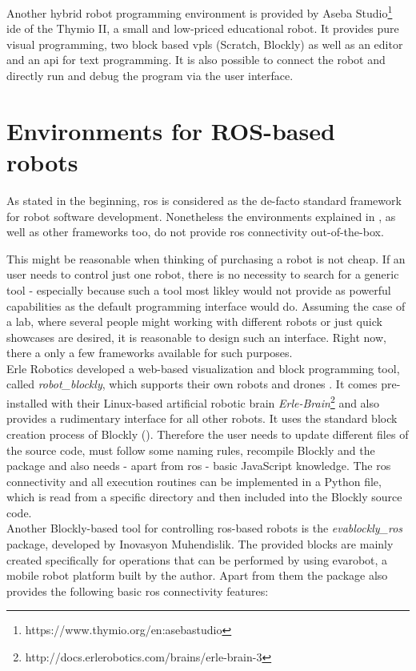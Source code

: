 Another hybrid robot programming environment is provided by Aseba Studio\footnote{https://www.thymio.org/en:asebastudio} \gls{ide} of the Thymio II, a small and low-priced educational robot. It provides pure visual programming, two block based \glspl{vpl} (Scratch, Blockly) as well as an editor and an \gls{api} for text programming. It is also possible to connect the robot and directly run and debug the program via the user interface.

\section{Environments for ROS-based robots} \label{sec:RosEnvs}
As stated in the beginning, \gls{ros} is considered as the de-facto standard framework for robot software development. Nonetheless the environments explained in , as well as other frameworks too, do not provide \gls{ros} connectivity out-of-the-box.

This might be reasonable when thinking of purchasing a robot is not cheap. If an user needs to control just one robot, there is no necessity to search for a generic tool - especially because such a tool most likley would not provide as powerful capabilities as the default programming interface would do. Assuming the case of a lab, where several people might working with different robots or just quick showcases are desired, it is reasonable to design such an interface. Right now, there a only a few frameworks available for such purposes. \\

Erle Robotics developed a web-based visualization and block programming tool, called \textit{robot\_blockly}, which supports their own robots and drones \cite{erleblockly}. It comes pre-installed with their Linux-based artificial robotic brain \textit{Erle-Brain}\footnote{http://docs.erlerobotics.com/brains/erle-brain-3} and also provides a rudimentary interface for all other robots. It uses the standard block creation process of Blockly (). Therefore the user needs to update different files of the source code, must follow some naming rules, recompile Blockly and the package and also needs - apart from \gls{ros} - basic JavaScript knowledge. The \gls{ros} connectivity and all execution routines can be implemented in a Python file, which is read from a specific directory and then included into the Blockly source code. \\

Another Blockly-based tool for controlling \gls{ros}-based robots is the \textit{evablockly\_ros} package, developed by Inovasyon Muhendislik\cite{evablocklyros}. The provided blocks are mainly created specifically for operations that can be performed by using evarobot, a mobile robot platform built by the author. Apart from them the package also provides the following basic \gls{ros} connectivity features:

